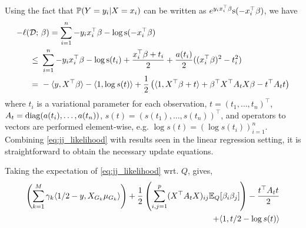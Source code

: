 \documentclass[12pt]{article}
\begin{document}
Using the fact that $\P(Y=y_i | X=x_i)$ can be written as $e^{y_i x_i^\top \beta} \sigmoid(- x_i^\top \beta)$, we have
\begin{align}
    - \ell(\D; &\ \beta)
    = 
	\sum_{i=1}^n  
	    - y_i x_i^\top \beta 
	    - \log \sigmoid (-x_i^\top \beta)
    \nonumber \\
    \leq &\
	\sum_{i=1}^n  
	    - y_i x_i^\top \beta 
	    - \log \sigmoid (t_i)
	    + \frac{x_i^\top \beta + t_i}{2}
	    + \frac{a(t_i)}{2} ((x_i^\top \beta)^2 - t_i^2)
    \nonumber \\
    = &\ 
	- \langle y,  X^\top \beta \rangle 
	- \langle 1, \log s(t) \rangle
	+ \frac{1}{2} \left(
	    \langle 1, X^\top \beta + t \rangle
	    + \beta^\top X^\top A_t X \beta 
	    - t^\top A_t t
	\right)
    \label{eq:jj_likelihood}
\end{align}
where $t_i$ is a variational parameter for each observation, $t=(t_1, \dots, t_n)^\top$, $A_t =\diag(a(t_i), \dots, a(t_n))$, $s(t) = (s(t_1), \dots, s(t_n))^\top$, and operators to vectors are performed element-wise, e.g. $\log s(t) = (\log s(t_i))_{i=1}^n$. Combining \eqref{eq:jj_likelihood} with results seen in the linear regression setting, it is straightforward to obtain the necessary update equations. 

Taking the expectation of \eqref{eq:jj_likelihood} wrt. $Q$, gives,
\begin{equation} \label{eq:jj_expectation_Q} 
\begin{aligned}
    \left(
    \sum_{k = 1}^M 
	\gamma_k \langle 1/2 - y,  X_{G_k} \mu_{G_k} \rangle 
    \right) 
    +
    \frac{1}{2}
    \left(
	\sum_{i,j=1}^p 
	    (X^\top A_t X)_{ij} \E_Q [ \beta_i \beta_j ]
    \right)
    - 
    \frac{t^\top A_t t}{2}
    \\
    + \langle 1, t/2 - \log s(t) \rangle
\end{aligned}
\end{equation}
\end{document}
